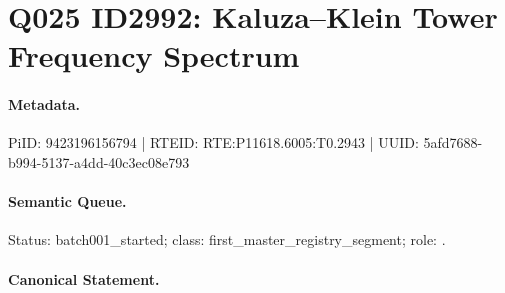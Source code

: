 \section*{Q025 ID2992: Kaluza–Klein Tower Frequency Spectrum}
\paragraph{Metadata.}
PiID: 9423196156794 | RTEID: RTE:P11618.6005:T0.2943 | UUID: 5afd7688-b994-5137-a4dd-40c3ec08e793

\paragraph{Semantic Queue.}
Status: batch001\_started; class: first\_master\_registry\_segment; role: .

\paragraph{Canonical Statement.}
